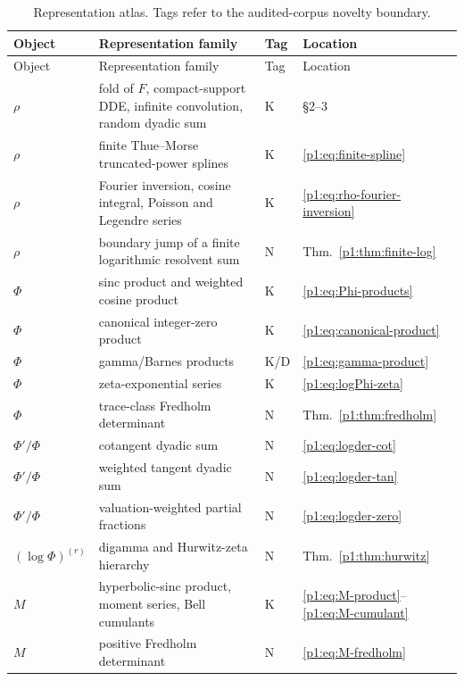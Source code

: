 \documentclass[11pt]{article}
\theoremstyle{definition}
\theoremstyle{remark}
\newcommand{\statusknown}{\textsf{K}}
\newcommand{\statusderived}{\textsf{D}}
\newcommand{\statusnew}{\textsf{N}}
\begin{document}
\small
\begin{longtable}{@{}p{}p{}p{}p{}@{}}
\caption{Representation atlas.  Tags refer to the audited-corpus novelty boundary.}
\label{p1:tab:atlas}\\
\toprule
Object & Representation family & Tag & Location \\
\midrule
\endfirsthead
\toprule
Object & Representation family & Tag & Location \\
\midrule
\endhead
\(\rho\) & fold of \(F\), compact-support DDE, infinite convolution, random dyadic sum & \statusknown & \S2--3 \\
\(\rho\) & finite Thue--Morse truncated-power splines & \statusknown & \eqref{p1:eq:finite-spline} \\
\(\rho\) & Fourier inversion, cosine integral, Poisson and Legendre series & \statusknown & \eqref{p1:eq:rho-fourier-inversion} \\
\(\rho\) & boundary jump of a finite logarithmic resolvent sum & \statusnew & Thm.~\ref{p1:thm:finite-log} \\
\(\Phi\) & sinc product and weighted cosine product & \statusknown & \eqref{p1:eq:Phi-products} \\
\(\Phi\) & canonical integer-zero product & \statusknown & \eqref{p1:eq:canonical-product} \\
\(\Phi\) & gamma/Barnes products & \statusknown/\statusderived & \eqref{p1:eq:gamma-product} \\
\(\Phi\) & zeta-exponential series & \statusknown & \eqref{p1:eq:logPhi-zeta} \\
\(\Phi\) & trace-class Fredholm determinant & \statusnew & Thm.~\ref{p1:thm:fredholm} \\
\(\Phi'/\Phi\) & cotangent dyadic sum & \statusnew & \eqref{p1:eq:logder-cot} \\
\(\Phi'/\Phi\) & weighted tangent dyadic sum & \statusnew & \eqref{p1:eq:logder-tan} \\
\(\Phi'/\Phi\) & valuation-weighted partial fractions & \statusnew & \eqref{p1:eq:logder-zero} \\
\((\log\Phi)^{(r)}\) & digamma and Hurwitz-zeta hierarchy & \statusnew & Thm.~\ref{p1:thm:hurwitz} \\
\(M\) & hyperbolic-sinc product, moment series, Bell cumulants & \statusknown & \eqref{p1:eq:M-product}--\eqref{p1:eq:M-cumulant} \\
\(M\) & positive Fredholm determinant & \statusnew & \eqref{p1:eq:M-fredholm} \\

\end{longtable}
\end{document}
